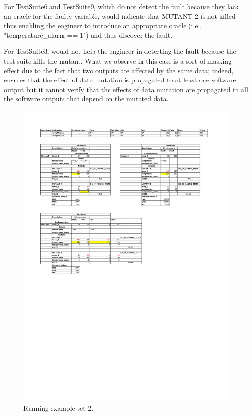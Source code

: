 For TestSuite6 and TestSuite9, which do not detect the fault because they lack an oracle for the faulty variable, \APPR would indicate that MUTANT 2 is not killed thus enabling the engineer to introduce an appropriate oracle (i.e., "temperature\_alarm == 1") and thus discover the fault. 

For TestSuite3, \APPR would not help the engineer in detecting the fault because the test suite kills the mutant. What we observe in this case is a sort of masking effect due to the fact that two outputs are affected by the same data; indeed, \APPR ensures that the effect of data mutation is propagated to at least one software output but it cannot verify that the effects of data mutation are propagated to all the software outputs that depend on the mutated data. 

\begin{figure}[tb]
\centering
\includegraphics[width=14cm]{damat/DataDrivenExample2}
\caption{Running example set 2.}
\label{fig:damat:RunningExample2}
\end{figure}

